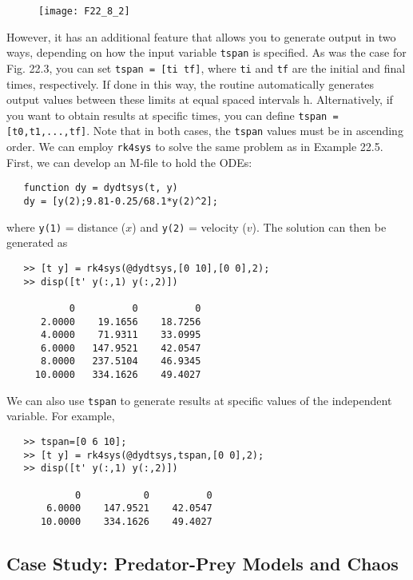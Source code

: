 \documentclass[../main.tex]{subfiles}
\begin{document}
\begin{figure}[hbt!]
	\texttt{[image: F22\_8\_2]}
	\label{F22.8.2}
\end{figure}

However, it has an additional feature that allows you to generate output in two ways,
depending on how the input variable \texttt{tspan} is specified. As was the case for Fig. 22.3, you
can set \texttt{tspan = [ti tf]}, where \texttt{ti} and \texttt{tf} are the initial and final times, respectively.
If done in this way, the routine automatically generates output values between these limits
at equal spaced intervals h. Alternatively, if you want to obtain results at specific times, you
can define \texttt{tspan = [t0,t1,...,tf]}. Note that in both cases, the \texttt{tspan} values must
be in ascending order.
We can employ \texttt{rk4sys} to solve the same problem as in Example 22.5. First, we can
develop an M-file to hold the ODEs:

\begin{verbatim}
   function dy = dydtsys(t, y)
   dy = [y(2);9.81-0.25/68.1*y(2)^2];
\end{verbatim}

where \texttt{y(1)} = distance ($x$) and \texttt{y(2)} = velocity ($v$). The solution can then be generated as

\begin{verbatim}
   >> [t y] = rk4sys(@dydtsys,[0 10],[0 0],2);
   >> disp([t' y(:,1) y(:,2)])
   
           0          0          0
      2.0000    19.1656    18.7256
      4.0000    71.9311    33.0995
      6.0000   147.9521    42.0547
      8.0000   237.5104    46.9345
     10.0000   334.1626    49.4027
\end{verbatim}

We can also use \texttt{tspan} to generate results at specific values of the independent variable. For example,

\begin{verbatim}
   >> tspan=[0 6 10];
   >> [t y] = rk4sys(@dydtsys,tspan,[0 0],2);
   >> disp([t' y(:,1) y(:,2)])

            0           0          0
       6.0000    147.9521    42.0547
      10.0000    334.1626    49.4027
\end{verbatim}

\subsection{Case Study: Predator-Prey Models and Chaos}
\end{document}
